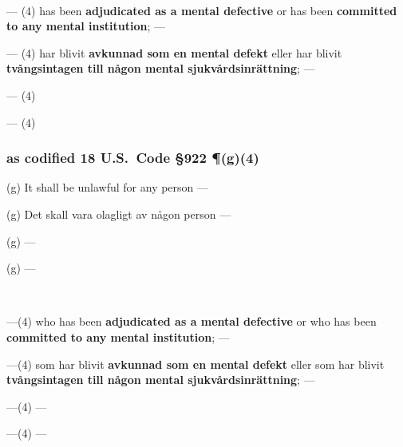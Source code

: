 \documentclass[a4paper,landscape,12pt]{article}
\begin{document}
~

\begin{minipage}[t]{0.22\textwidth}
--- (4) has been \textbf{adjudicated as a mental defective} or has been \textbf{committed to any mental institution}; ---
\end{minipage}\textwidth
\begin{minipage}[t]{0.22\textwidth}
--- (4) har blivit \textbf{avkunnad som en mental defekt} eller har blivit \textbf{tvångsintagen till någon mental sjukvårdsinrättning}; ---
\end{minipage}\textwidth
\begin{minipage}[t]{0.22\textwidth}
--- (4)
\end{minipage}\textwidth
\begin{minipage}[t]{0.22\textwidth}
--- (4)
\end{minipage}

\subsubsection*{as codified 18 U.S.~Code \S 922 \P(g)(4)}


\begin{minipage}[t]{0.22\textwidth}
(g) It shall be unlawful for any person ---
\end{minipage}\textwidth
\begin{minipage}[t]{0.22\textwidth}
(g) Det skall vara olagligt av någon person ---
\end{minipage}\textwidth
\begin{minipage}[t]{0.22\textwidth}
(g) ---
\end{minipage}\textwidth
\begin{minipage}[t]{0.22\textwidth}
(g) ---
\end{minipage}

~

\begin{minipage}[t]{0.22\textwidth}
---(4) who has been \textbf{adjudicated as a mental defective} or who has been \textbf{committed to any mental institution}; ---
\end{minipage}\textwidth
\begin{minipage}[t]{0.22\textwidth}
---(4) som har blivit \textbf{avkunnad som en mental defekt} eller som har blivit \textbf{tvångsintagen till någon mental sjukvårdsinrättning}; ---
\end{minipage}\textwidth
\begin{minipage}[t]{0.22\textwidth}
---(4) ---
\end{minipage}\textwidth
\begin{minipage}[t]{0.22\textwidth}
---(4) ---
\end{minipage}
\end{document}
